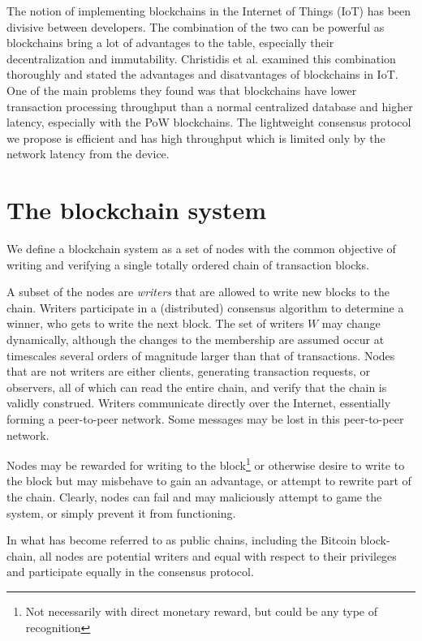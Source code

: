 \documentclass[10pt]{article}
\begin{document}
The notion of implementing blockchains in the Internet of Things (IoT) has been divisive between developers. The combination of the two can be powerful as blockchains bring a lot of advantages to the table, especially their decentralization and immutability. Christidis et al.\cite{christidis2016blockchains} examined this combination thoroughly and stated the advantages and disatvantages of blockchains in IoT. One of the main problems they found was that blockchains have lower transaction processing throughput than a normal centralized database and higher latency, especially with the PoW blockchains. The lightweight consensus protocol we propose is efficient and has high throughput which is limited only by the network latency from the device.



\section{The blockchain system}

We define a blockchain system as a set of nodes with the common objective of writing and verifying a single totally ordered chain of transaction blocks. 

A subset of the nodes are \emph{writers} that are allowed to write new blocks to the chain. Writers participate in a (distributed) consensus algorithm to determine a winner, who gets to write the next block. The set of writers $W$ may change dynamically, although  the changes to the membership are assumed occur at timescales several orders of magnitude larger than that of transactions.  
Nodes that are not writers are  either clients, generating transaction requests, or observers, all of which can read the entire chain, and verify that the chain is validly construed. %
Writers communicate directly over the Internet, essentially forming a peer-to-peer network. Some messages may be lost in this peer-to-peer network. 

Nodes may be rewarded for writing to the block\footnote{Not necessarily with direct monetary reward, but could be any type of recognition} or otherwise desire to write to the block but may misbehave to gain an advantage, or attempt to rewrite part of the chain. Clearly, nodes can fail and may maliciously attempt to game the system, or simply prevent it from functioning.

In what has become referred to as public chains, including the Bitcoin block-chain, all nodes are potential writers and equal with respect to their privileges and participate equally in the consensus protocol.
\end{document}
